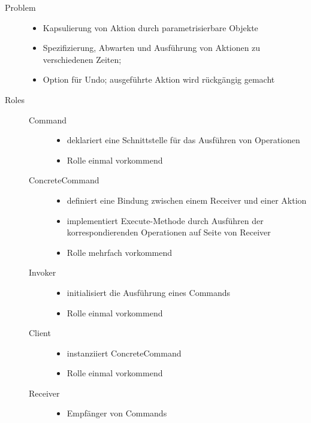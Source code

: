 \begin{description}
    \item[Problem] \hfill 
    \begin{itemize}
        \item Kapsulierung von Aktion durch parametrisierbare Objekte
        \item Spezifizierung, Abwarten und Ausführung von Aktionen zu verschiedenen Zeiten;
        \item Option für Undo; ausgeführte Aktion wird rückgängig gemacht
    \end{itemize}
    \item[Roles] \hfill
    \begin{description}
        \item[Command] \hfill
        \begin{itemize}
            \item deklariert eine Schnittstelle für das Ausführen von Operationen
            \item Rolle einmal vorkommend
        \end{itemize}
        \item[ConcreteCommand] \hfill
        \begin{itemize}
            \item definiert eine Bindung zwischen einem Receiver und einer Aktion
            \item implementiert Execute-Methode durch Ausführen der korrespondierenden Operationen auf Seite von Receiver
            \item Rolle mehrfach vorkommend
        \end{itemize}
        \item[Invoker] \hfill
        \begin{itemize}
            \item initialisiert die Ausführung eines Commands
            \item Rolle einmal vorkommend
        \end{itemize}
        \item[Client] \hfill
        \begin{itemize}
            \item instanziiert ConcreteCommand
            \item Rolle einmal vorkommend
        \end{itemize}
        \item[Receiver] \hfill
        \begin{itemize}
            \item Empfänger von Commands

\end{itemize}
\end{description}
\end{description}
